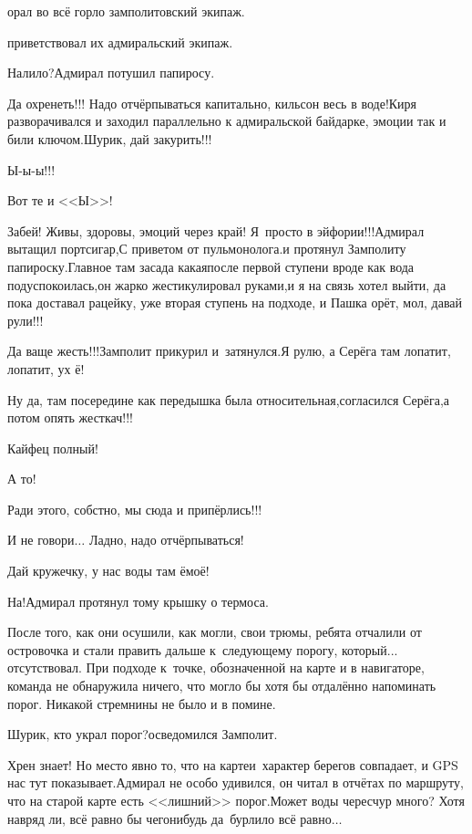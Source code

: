 \mdash орал во всё горло замполитовский экипаж.

\mdash приветствовал их адмиральский экипаж.

\diagdash Налило?\mdash Адмирал потушил папиросу.

\diagdash Да охренеть!!! Надо отчёрпываться капитально, кильсон весь в воде!\mdash Киря разворачивался и заходил параллельно к адмиральской байдарке, эмоции так и били ключом.\mdash Шурик, дай закурить!!!

\diagdash Ы-ы-ы!!!

\diagdash Вот те и <<Ы>>!

\diagdash Забей! Живы, здоровы, эмоций через край! Я~просто в эйфории!!!\mdash Адмирал вытащил портсигар,\mdash С приветом от пульмонолога.\mdash и протянул Замполиту папироску.\mdash Главное там засада какая\mdash после первой ступени вроде как вода подуспокоилась,\mdash он жарко жестикулировал руками,\mdash и я на связь хотел выйти, да пока доставал рацейку, уже вторая ступень на подходе, и Пашка орёт, мол, давай рули!!!

\diagdash Да ваще жесть!!!\mdash Замполит прикурил и~затянулся.\mdash Я рулю, а Серёга там лопатит, лопатит, ух ё!

\diagdash Ну да, там посередине как передышка была относительная,\mdash согласился Серёга,\mdash а потом опять жесткач!!!

\diagdash Кайфец полный!

\diagdash А то!

\diagdash Ради этого, собстно, мы сюда и припёрлись!!!

\diagdash И не говори$\ldots$ Ладно, надо отчёрпываться!

\diagdash Дай кружечку, у нас воды там ё\sdash моё!

\diagdash На!\mdash Адмирал протянул тому крышку о термоса.

После того, как они осушили, как могли, свои трюмы, ребята отчалили от островочка и стали править дальше к~следующему порогу, который... отсутствовал. При подходе к~точке, обозначенной на карте и в навигаторе, команда не обнаружила ничего, что могло бы хотя бы отдалённо напоминать порог. Никакой стремнины не было и в помине.

\diagdash Шурик, кто украл порог?\mdash осведомился Замполит. 

\diagdash Хрен знает! Но место явно то, что на карте\mdash и~характер берегов совпадает, и GPS нас тут показывает.\mdash Адмирал не особо удивился, он читал в отчётах по маршруту, что на старой карте есть <<лишний>> порог.\mdash Может воды чересчур много? Хотя навряд ли, всё равно бы чего\sdash нибудь да~бурлило всё равно$\ldots$

